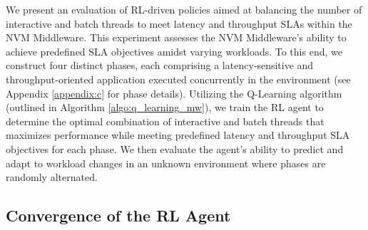 

We present an evaluation of RL-driven policies aimed at balancing the number of interactive and batch threads to meet latency and throughput SLAs within the NVM Middleware. This experiment assesses the NVM Middleware's ability to achieve predefined SLA objectives amidst varying workloads. To this end, we construct four distinct phases, each comprising a latency-sensitive and throughput-oriented application executed concurrently in the environment (see Appendix \ref{appendix:c} for phase details). Utilizing the Q-Learning algorithm (outlined in Algorithm \ref{algo:q_learning_mw}), we train the RL agent to determine the optimal combination of interactive and batch threads that maximizes performance while meeting predefined latency and throughput SLA objectives for each phase. We then evaluate the agent's ability to predict and adapt to workload changes in an unknown environment where phases are randomly alternated.

\subsection*{Convergence of the RL Agent}

